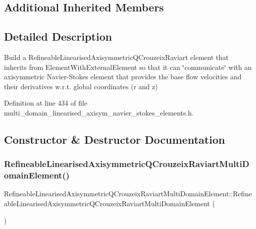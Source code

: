 \subsection*{Additional Inherited Members}


\subsection{Detailed Description}
Build a Refineable\+Linearised\+Axisymmetric\+Q\+Crouzeix\+Raviart element that inherits from Element\+With\+External\+Element so that it can \char`\"{}communicate\char`\"{} with an axisymmetric Navier-\/\+Stokes element that provides the base flow velocities and their derivatives w.\+r.\+t. global coordinates (r and z) 

Definition at line 434 of file multi\+\_\+domain\+\_\+linearised\+\_\+axisym\+\_\+navier\+\_\+stokes\+\_\+elements.\+h.



\subsection{Constructor \& Destructor Documentation}
\mbox{\label{classRefineableLinearisedAxisymmetricQCrouzeixRaviartMultiDomainElement_a28bb9ce4f05c21b8ddf02ab3516667e0}} 
\subsubsection{\texorpdfstring{Refineable\+Linearised\+Axisymmetric\+Q\+Crouzeix\+Raviart\+Multi\+Domain\+Element()}{RefineableLinearisedAxisymmetricQCrouzeixRaviartMultiDomainElement()}}
{\footnotesize\ttfamily Refineable\+Linearised\+Axisymmetric\+Q\+Crouzeix\+Raviart\+Multi\+Domain\+Element\+::\+Refineable\+Linearised\+Axisymmetric\+Q\+Crouzeix\+Raviart\+Multi\+Domain\+Element (\begin{DoxyParamCaption}{ }\end{DoxyParamCaption})\hspace{0.3cm}{\ttfamily [inline]}}



